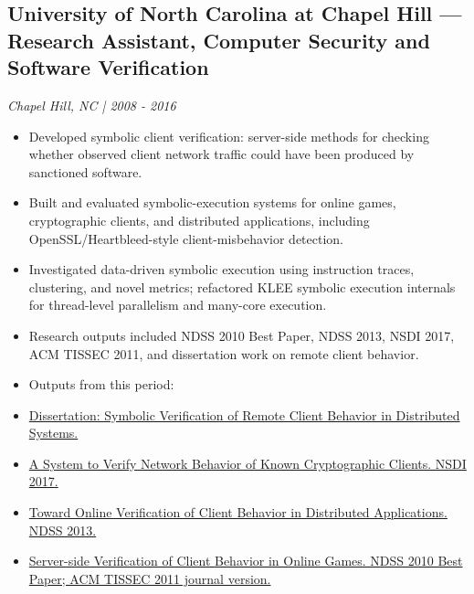 \documentclass[10pt,letterpaper]{article}
\begin{document}
\subsection*{University of North Carolina at Chapel Hill — Research Assistant, Computer Security and Software Verification}

\emph{Chapel Hill, NC | 2008 - 2016}

\begin{itemize}

  \item Developed symbolic client verification: server-side methods for checking whether observed client network traffic could have been produced by sanctioned software.

  \item Built and evaluated symbolic-execution systems for online games, cryptographic clients, and distributed applications, including OpenSSL/Heartbleed-style client-misbehavior detection.

  \item Investigated data-driven symbolic execution using instruction traces, clustering, and novel metrics; refactored KLEE symbolic execution internals for thread-level parallelism and many-core execution.

  \item Research outputs included NDSS 2010 Best Paper, NDSS 2013, NSDI 2017, ACM TISSEC 2011, and dissertation work on remote client behavior.

  \item Outputs from this period:

  \item \href{https://cdr.lib.unc.edu/concern/dissertations/p8418p298}{Dissertation: Symbolic Verification of Remote Client Behavior in Distributed Systems.}

  \item \href{https://www.usenix.org/conference/nsdi17/technical-sessions/presentation/chi}{A System to Verify Network Behavior of Known Cryptographic Clients. NSDI 2017.}

  \item \href{https://www.ndss-symposium.org/ndss-2013-programme/toward-online-verification-client-behavior-distributed-applications/}{Toward Online Verification of Client Behavior in Distributed Applications. NDSS 2013.}

  \item \href{https://www.ndss-symposium.org/wp-content/uploads/2017/09/beth.pdf}{Server-side Verification of Client Behavior in Online Games. NDSS 2010 Best Paper; ACM TISSEC 2011 journal version.}

\end{itemize}
\end{document}
